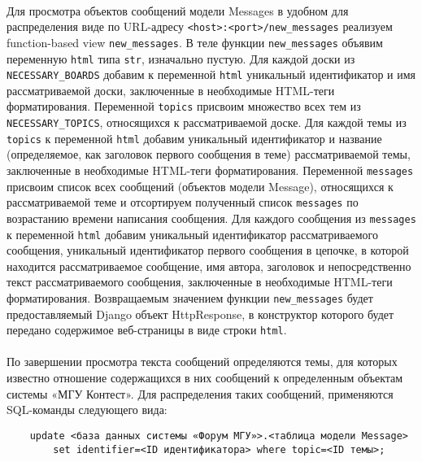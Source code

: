 \documentclass[12pt, a4paper, oneside]{article}
\begin{document}
\paragraph{}
Для просмотра объектов сообщений модели Messages в удобном для распределения виде по URL-адресу \texttt{<host>:<port>/new\_messages} реализуем function-based view \texttt{new\_messages}. В теле функции \texttt{new\_messages} объявим переменную \texttt{html} типа \texttt{str}, изначально пустую. Для каждой доски из \texttt{NECESSARY\_BOARDS} добавим к переменной \texttt{html} уникальный идентификатор и имя рассматриваемой доски, заключенные в необходимые HTML-теги форматирования. Переменной \texttt{topics} присвоим множество всех тем из \texttt{NECESSARY\_TOPICS}, относящихся к рассматриваемой доске. Для каждой темы из \texttt{topics} к переменной \texttt{html} добавим уникальный идентификатор и название (определяемое, как заголовок первого сообщения в теме) рассматриваемой темы, заключенные в необходимые HTML-теги форматирования. Переменной \texttt{messages} присвоим список всех сообщений (объектов модели Message), относящихся к рассматриваемой теме и отсортируем полученный список \texttt{messages} по возрастанию времени написания сообщения. Для каждого сообщения из \texttt{messages} к переменной \texttt{html} добавим уникальный идентификатор рассматриваемого сообщения, уникальный идентификатор первого сообщения в цепочке, в которой находится рассматриваемое сообщение, имя автора, заголовок и непосредственно текст рассматриваемого сообщения, заключенные в необходимые HTML-теги форматирования. Возвращаемым значением функции \texttt{new\_messages} будет предоставляемый Django объект HttpResponse, в конструктор которого будет передано содержимое веб-страницы в виде строки \texttt{html}.
\paragraph{}
По завершении просмотра текста сообщений определяются темы, для которых известно отношение содержащихся в них сообщений к определенным объектам системы «МГУ Контест». Для распределения таких сообщений, применяются SQL-команды следующего вида:
\begin{verbatim}
    update <база данных системы «Форум МГУ»>.<таблица модели Message> 
        set identifier=<ID идентификатора> where topic=<ID темы>;
\end{verbatim}
\end{document}
